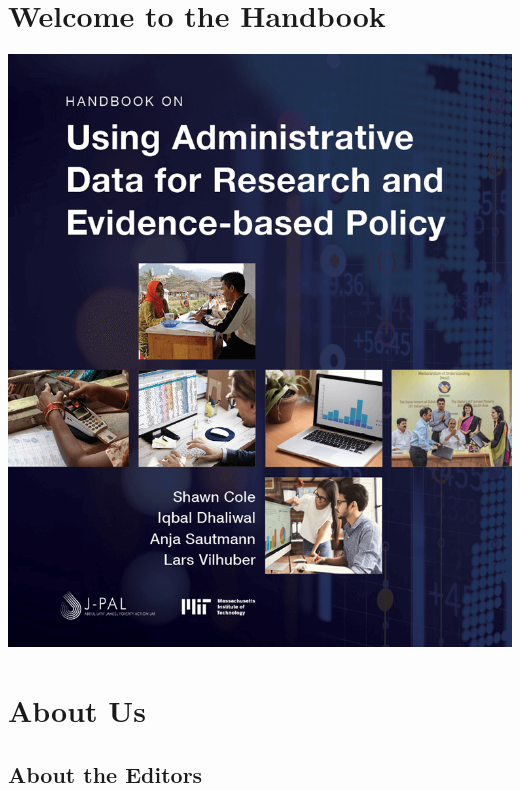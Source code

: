 \documentclass[
]{WileySix}
\begin{document}

{
\setcounter{tocdepth}{1}
\tableofcontents
}


\hypertarget{welcome-to-the-handbook}{%
\section*{Welcome to the Handbook}\label{welcome-to-the-handbook}}

\includegraphics{./assets/images/webcover.png}

\hypertarget{about}{%
\section*{About Us}\label{about}}

\hypertarget{about-the-editors}{%
\subsection*{About the Editors}\label{about-the-editors}}
\end{document}
